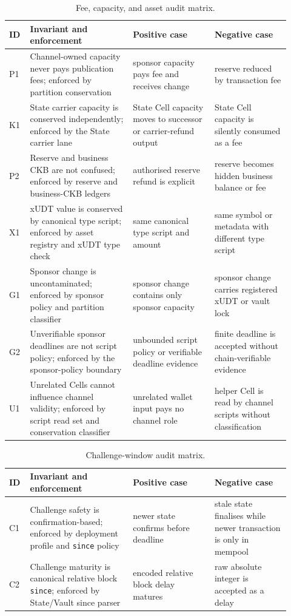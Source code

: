 \documentclass[a4paper,11pt]{article}
\begin{document}
\begin{table}[H]
\centering
\footnotesize
\setlength{\tabcolsep}{4pt}
\begin{tabular}{L{0.06\linewidth}L{0.34\linewidth}L{0.27\linewidth}L{0.25\linewidth}}
\toprule
ID & Invariant and enforcement & Positive case & Negative case \\
\midrule
P1 & Channel-owned capacity never pays publication fees; enforced by partition conservation & sponsor capacity pays fee and receives change & reserve reduced by transaction fee \\
K1 & State carrier capacity is conserved independently; enforced by the State carrier lane & State Cell capacity moves to successor or carrier-refund output & State Cell capacity is silently consumed as a fee \\
P2 & Reserve and business CKB are not confused; enforced by reserve and business-CKB ledgers & authorised reserve refund is explicit & reserve becomes hidden business balance or fee \\
X1 & xUDT value is conserved by canonical type script; enforced by asset registry and xUDT type check & same canonical type script and amount & same symbol or metadata with different type script \\
G1 & Sponsor change is uncontaminated; enforced by sponsor policy and partition classifier & sponsor change contains only sponsor capacity & sponsor change carries registered xUDT or vault lock \\
G2 & Unverifiable sponsor deadlines are not script policy; enforced by the sponsor-policy boundary & unbounded script policy or verifiable deadline evidence & finite deadline is accepted without chain-verifiable evidence \\
U1 & Unrelated Cells cannot influence channel validity; enforced by script read set and conservation classifier & unrelated wallet input pays no channel role & helper Cell is read by channel scripts without classification \\
\bottomrule
\end{tabular}
\caption{Fee, capacity, and asset audit matrix.}
\label{tab:audit-fee-assets}
\end{table}

\begin{table}[H]
\centering
\footnotesize
\setlength{\tabcolsep}{4pt}
\begin{tabular}{L{0.06\linewidth}L{0.34\linewidth}L{0.27\linewidth}L{0.25\linewidth}}
\toprule
ID & Invariant and enforcement & Positive case & Negative case \\
\midrule
C1 & Challenge safety is confirmation-based; enforced by deployment profile and \texttt{since} policy & newer state confirms before deadline & stale state finalises while newer transaction is only in mempool \\
C2 & Challenge maturity is canonical relative block \texttt{since}; enforced by State/Vault since parser & encoded relative block delay matures & raw absolute integer is accepted as a delay \\
\bottomrule
\end{tabular}
\caption{Challenge-window audit matrix.}
\label{tab:audit-challenge}
\end{table}
\end{document}
